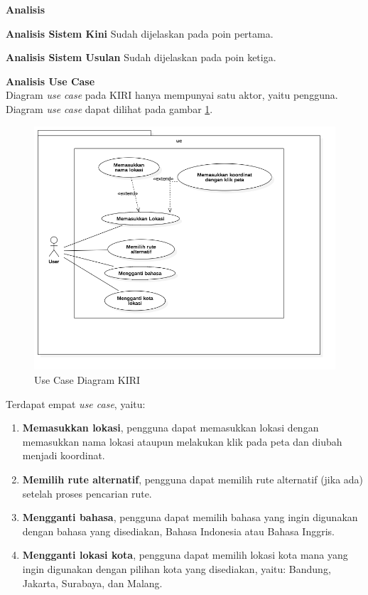 \documentclass[a4paper,twoside]{article}
\begin{document}
\textbf{Analisis}

\textbf{Analisis Sistem Kini}
Sudah dijelaskan pada poin pertama.

\textbf{Analisis Sistem Usulan}
Sudah dijelaskan pada poin ketiga.

\textbf{Analisis Use Case}\\
Diagram \textit{use case} pada KIRI hanya mempunyai satu aktor, yaitu pengguna. Diagram \textit{use case} dapat dilihat pada gambar \ref{fig:3_usecase}.

\begin{figure}[H]
	\centering
	\includegraphics[scale=0.5]{Gambar/usecase}
	\caption{Use Case Diagram KIRI} 
	\label{fig:3_usecase}
\end{figure}

Terdapat empat \textit{use case}, yaitu:
\begin{enumerate}
	\item \textbf{Memasukkan lokasi}, pengguna dapat memasukkan lokasi dengan memasukkan nama lokasi ataupun melakukan klik pada peta dan diubah menjadi koordinat.
	\item \textbf{Memilih rute alternatif}, pengguna dapat memilih rute alternatif (jika ada) setelah proses pencarian rute.
	\item \textbf{Mengganti bahasa}, pengguna dapat memilih bahasa yang ingin digunakan dengan bahasa yang disediakan, Bahasa Indonesia atau Bahasa Inggris.
	\item \textbf{Mengganti lokasi kota}, pengguna dapat memilih lokasi kota mana yang ingin digunakan dengan pilihan kota yang disediakan, yaitu: Bandung, Jakarta, Surabaya, dan Malang.
	
\end{enumerate}
\end{document}
